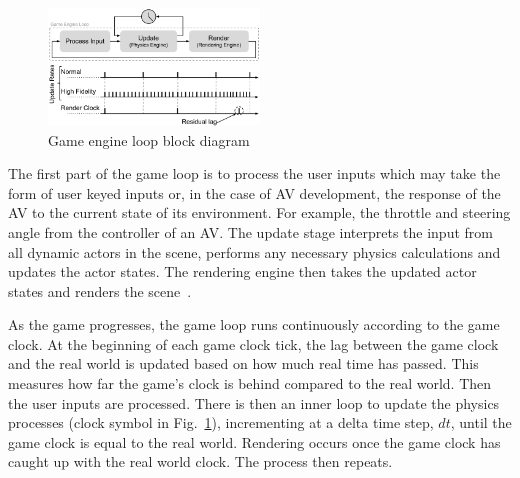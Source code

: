 \documentclass[letterpaper, 10 pt, journal, twoside]{IEEEtran}
\begin{document}
\begin{figure}[h]
\centering
\includegraphics[width=0.5\textwidth]{Other/Figures/GameEngineLoop.pdf}
\caption{Game engine loop block diagram~\cite{GameProgPatternsBook}}
\label{GameEngineLoopDiagram}
\end{figure}

The first part of the game loop is to process the user inputs which may take the form of user keyed inputs or, in the case of AV development, the response of the AV to the current state of its environment. For example, the throttle and steering angle from the controller of an AV. The update stage interprets the input from all dynamic actors in the scene, performs any necessary physics calculations and updates the actor states. The rendering engine then takes the updated actor states and renders the scene~\cite{GameProgPatternsBook}. 

% 

As the game progresses, the game loop runs continuously according to the game clock.
%
At the beginning of each game clock tick, the lag between the game clock and the real world is updated based on how much real time has passed. This measures how far the game's clock is behind compared to the real world. 
%
Then the user inputs are processed.
%
There is then an inner loop to update the physics processes (clock symbol in Fig.~\ref{GameEngineLoopDiagram}), incrementing at a delta time step, $dt$, until the game clock is equal to the real world. 
%
Rendering occurs once the game clock has caught up with the real world clock. 
%
The process then repeats.
\end{document}
